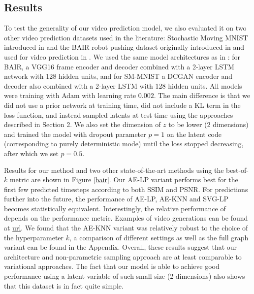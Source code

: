 \documentclass{article}
\begin{document}
\subsection{Results}

To test the generality of our video prediction model, we also evaluated it on two other video prediction datasets used in the literature: Stochastic Moving MNIST introduced in \citep{Denton2018} and the BAIR robot pushing dataset originally introduced in \citep{Ebert17} and used for video prediction in \citep{Babaeizadeh2018, Denton2018}.
We used the same model architectures as in \citep{Denton2018}: for BAIR, a VGG16 frame encoder and decoder combined with a 2-layer LSTM network with 128 hidden units, and for SM-MNIST a DCGAN encoder and decoder also combined with a 2-layer LSTM with 128 hidden units. All models were training with Adam \citep{ADAM} with learning rate $0.002$.
The main difference is that we did not use a prior network at training time, did not include a KL term in the loss function, and instead sampled latents at test time using the approaches described in Section 2.
We also set the dimension of $z$ to be lower (2 dimensions) and trained the model with dropout parameter $p=1$ on the latent code (corresponding to purely deterministic mode) until the loss stopped decreasing, after which we set $p=0.5$.

Results for our method and two other state-of-the-art methods using the best-of-$k$ metric are shown in Figure \ref{bair}. Our AE-LP variant performs best for the first few predicted timesteps according to both SSIM and PSNR. For predictions further into the future, the performance of AE-LP, AE-KNN and SVG-LP becomes statistically equivalent.  Interestingly, the relative performance of \citep{Babaeizadeh2018} depends on the performance metric. Examples of video generations can be found at \url{url}. We found that the AE-KNN variant was relatively robust to the choice of the hyperparameter $k$, a comparison of different settings as well as the full graph variant can be found in the Appendix. Overall, these results suggest that our architecture and non-parametric sampling approach are at least comparable to variational approaches. The fact that our model is able to achieve good performance using a latent variable of such small size (2 dimensions) also shows that this dataset is in fact quite simple.
\end{document}
